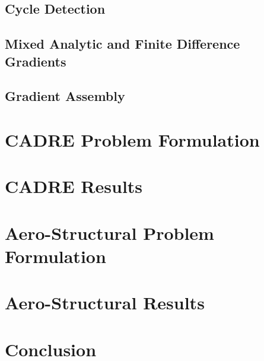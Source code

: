 \documentclass[]{aiaa-tc} %
\begin{document}
    \subsection{Cycle Detection}
    \subsection{Mixed Analytic and Finite Difference Gradients}
    \subsection{Gradient Assembly}

  \section{CADRE Problem Formulation}

  \section{CADRE Results}

  \section{Aero-Structural Problem Formulation}

  \section{Aero-Structural Results}

  \section{Conclusion}
 
  
\end{document}
